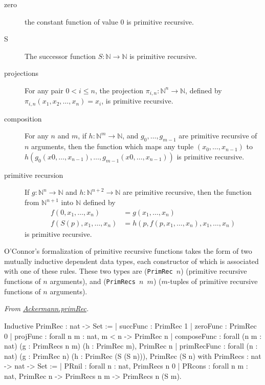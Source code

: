 \begin{description}
  \item[zero] the constant function of value $0$ is primitive recursive.
\item[S] The successor function $S:\mathbb{N}\rightarrow\mathbb{N}$ is primitive recursive.
 \item[projections] For any pair $0< i\leq n$, the projection $\pi_{i,n}: \mathbb{N}^n\rightarrow\mathbb{N}$, defined by $\pi_{i,n}(x_1,x_2,\dots,x_{n})=x_i$, is primitive recursive.
\item[composition] For any $n$ and $m$, if $h: \mathbb{N}^m\rightarrow\mathbb{N}$, and
$g_0,\dots, g_{m-1}$ are primitive recursive of $n$ arguments, then the function which maps any
tuple $(x_0,\dots,x_{n-1})$ to $h(g_0(x0,\dots,x_{n-1}),\dots, g_{m-1}(x0,\dots,x_{n-1}))$ is primitive recursive.
\item[primitive recursion]
If $g: \mathbb{N}^n\rightarrow\mathbb{N}$ and $h: \mathbb{N}^{n+2}\rightarrow\mathbb{N}$ are primitive recursive, then the function from $\mathbb{N}^{n+1}$ into $\mathbb{N}$ defined by
\begin{align}
f(0,x_1,\dots,x_n)&=g(x_1,\dots,x_n)\\
f(S(p),x_1,\dots,x_n)&=h(p,f(p, x_1,\dots,x_n),  x_1,\dots,x_n)
\end{align} 
is primitive recursive.
\end{description}

O'Connor's formalization of primitive recursive functions takes the form of two mutually inductive dependent data types, each constructor of which is associated with one of these  rules.
These two types are (\texttt{PrimRec $n$}) (primitive recursive functions of $n$ arguments), and
(\texttt{PrimRecs $n$ $m$}) ($m$-tuples of primitive recursive functions of $n$ arguments).


\label{def:Primrec}
\vspace{4pt}
\noindent
\emph{From \href{../theories/html/hydras.Ackermann.primRec.html}{Ackermann.primRec}.}
\begin{Coqsrc}
Inductive PrimRec : nat -> Set :=
  | succFunc : PrimRec 1
  | zeroFunc : PrimRec 0
  | projFunc : forall n m : nat, m < n -> PrimRec n
  | composeFunc :
      forall (n m : nat) (g : PrimRecs n m) (h : PrimRec m), PrimRec n
  | primRecFunc :
      forall (n : nat) (g : PrimRec n) (h : PrimRec (S (S n))), 
      PrimRec (S n)
with PrimRecs : nat -> nat -> Set :=
  | PRnil : forall n : nat, PrimRecs n 0
  | PRcons : forall n m : nat, PrimRec n -> PrimRecs n m -> 
                   PrimRecs n (S m).
\end{Coqsrc}

